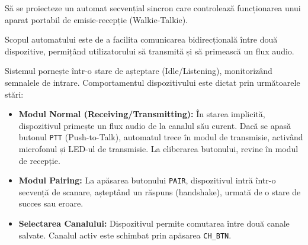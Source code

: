 Să se proiecteze un automat secvențial sincron care controlează funcționarea unui aparat portabil de emisie-recepție (Walkie-Talkie).

Scopul automatului este de a facilita comunicarea bidirecțională între două dispozitive, permițând utilizatorului să transmită și să primească un flux audio.

Sistemul pornește într-o stare de așteptare (Idle/Listening), monitorizând semnalele de intrare. Comportamentul dispozitivului este dictat prin următoarele stări:

\begin{itemize}
    \item \textbf{Modul Normal (Receiving/Transmitting):} În starea implicită, dispozitivul primește un flux audio de la canalul său curent.
    Dacă se apasă butonul \texttt{PTT} (Push-to-Talk), automatul trece în modul de transmisie, activând microfonul și LED-ul de transmisie.
    La eliberarea butonului, revine în modul de recepție.
    
    \item \textbf{Modul Pairing:} La apăsarea butonului \texttt{PAIR}, dispozitivul intră într-o secvență de scanare, așteptând un răspuns (handshake), urmată de o stare de succes sau eroare.
    
    \item \textbf{Selectarea Canalului:} Dispozitivul permite comutarea între două canale salvate. Canalul activ este schimbat prin apăsarea \texttt{CH\_BTN}.
\end{itemize}
